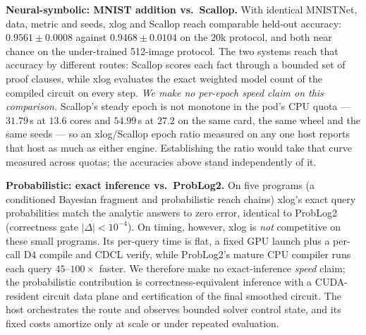 \textbf{Neural-symbolic: MNIST addition vs.\ Scallop.} With identical MNISTNet, data, metric and seeds, xlog and Scallop reach comparable held-out accuracy: $0.9561 \pm 0.0008$ against $0.9468 \pm 0.0104$ on the 20k protocol, and both near chance on the under-trained 512-image protocol. The two systems reach that accuracy by different routes: Scallop scores each fact through a bounded set of proof clauses, while xlog evaluates the exact weighted model count of the compiled circuit on every step. \emph{We make no per-epoch speed claim on this comparison.} Scallop's steady epoch is not monotone in the pod's CPU quota --- $31.79$\,s at $13.6$ cores and $54.99$\,s at $27.2$ on the same card, the same wheel and the same seeds --- so an xlog/Scallop epoch ratio measured on any one host reports that host as much as either engine. Establishing the ratio would take that curve measured across quotas; the accuracies above stand independently of it.

\textbf{Probabilistic: exact inference vs.\ ProbLog2.} On five programs (a conditioned Bayesian fragment and probabilistic reach chains) xlog's exact query probabilities match the analytic answers to zero error, identical to ProbLog2 (correctness gate $|\Delta| < 10^{-4}$). On timing, however, xlog is \emph{not} competitive on these small programs. Its per-query time is flat, a fixed GPU launch plus a per-call D4 compile and CDCL verify, while ProbLog2's mature CPU compiler runs each query $45$--$100\times$ faster. We therefore make no exact-inference \emph{speed} claim; the probabilistic contribution is correctness-equivalent inference with a CUDA-resident circuit data plane and certification of the final smoothed circuit. The host orchestrates the route and observes bounded solver control state, and its fixed costs amortize only at scale or under repeated evaluation.

